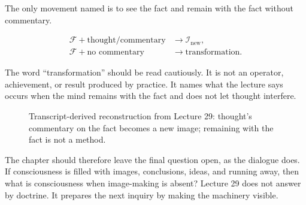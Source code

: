 \documentclass[11pt,oneside]{book}
\begin{document}
The only movement named is to see the fact and remain with the fact without commentary.

\begin{align}
\mathcal{F}+\text{thought/commentary}
&\longrightarrow \mathcal{I}_{\text{new}},\\
\mathcal{F}+\text{no commentary}
&\longrightarrow \text{transformation}.
\end{align}

The word ``transformation'' should be read cautiously. It is not an operator, achievement, or result produced by practice. It names what the lecture says occurs when the mind remains with the fact and does not let thought interfere.

\begin{figure}
\centering
{}
\caption{Transcript-derived reconstruction from Lecture 29: thought's commentary on the fact becomes a new image; remaining with the fact is not a method.}
\end{figure}

The chapter should therefore leave the final question open, as the dialogue does. If consciousness is filled with images, conclusions, ideas, and running away, then what is consciousness when image-making is absent? Lecture 29 does not answer by doctrine. It prepares the next inquiry by making the machinery visible.

\end{document}
